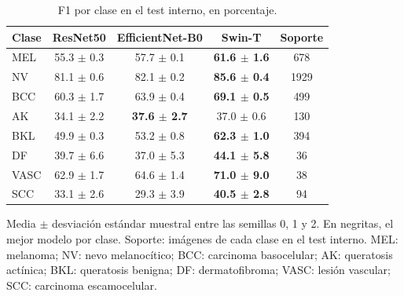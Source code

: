 \begin{table}[t]
\centering
\caption{F1 por clase en el test interno, en porcentaje.}
\label{tab:tabla3_f1_por_clase}
\footnotesize
\begin{tabular}{lcccc}
\toprule
Clase & ResNet50 & EfficientNet-B0 & Swin-T & Soporte \\
\midrule
MEL & 55.3 $\pm$ 0.3 & 57.7 $\pm$ 0.1 & \textbf{61.6 $\pm$ 1.6} & 678 \\
NV & 81.1 $\pm$ 0.6 & 82.1 $\pm$ 0.2 & \textbf{85.6 $\pm$ 0.4} & 1929 \\
BCC & 60.3 $\pm$ 1.7 & 63.9 $\pm$ 0.4 & \textbf{69.1 $\pm$ 0.5} & 499 \\
AK & 34.1 $\pm$ 2.2 & \textbf{37.6 $\pm$ 2.7} & 37.0 $\pm$ 0.6 & 130 \\
BKL & 49.9 $\pm$ 0.3 & 53.2 $\pm$ 0.8 & \textbf{62.3 $\pm$ 1.0} & 394 \\
DF & 39.7 $\pm$ 6.6 & 37.0 $\pm$ 5.3 & \textbf{44.1 $\pm$ 5.8} & 36 \\
VASC & 62.9 $\pm$ 1.7 & 64.6 $\pm$ 1.4 & \textbf{71.0 $\pm$ 9.0} & 38 \\
SCC & 33.1 $\pm$ 2.6 & 29.3 $\pm$ 3.9 & \textbf{40.5 $\pm$ 2.8} & 94 \\
\bottomrule
\end{tabular}
\par\vspace{2pt}
\parbox{\linewidth}{\scriptsize Media $\pm$ desviación estándar muestral entre las semillas 0, 1 y 2. En negritas, el mejor modelo por clase. Soporte: imágenes de cada clase en el test interno. MEL: melanoma; NV: nevo melanocítico; BCC: carcinoma basocelular; AK: queratosis actínica; BKL: queratosis benigna; DF: dermatofibroma; VASC: lesión vascular; SCC: carcinoma escamocelular.}
\end{table}
